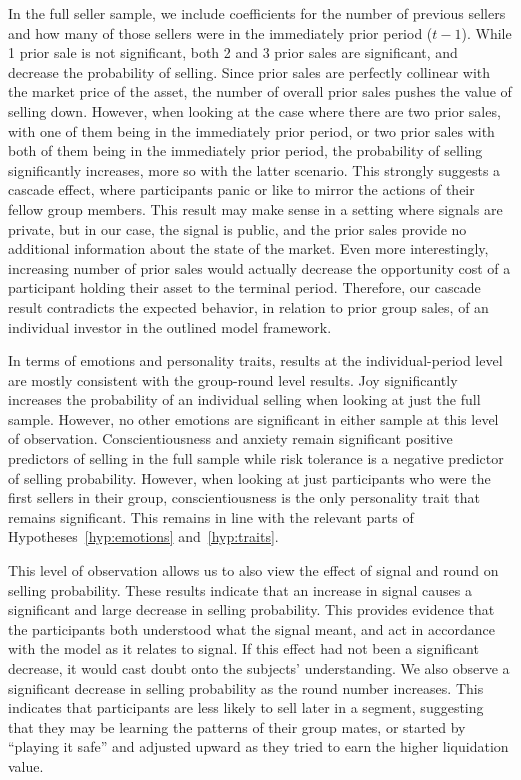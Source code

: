 \documentclass[thesis]{uathesis}
\begin{document}
\begin{body}
In the full seller sample, we include coefficients for the number of previous sellers and how many of those sellers were in the immediately prior period ($t-1$). While 1 prior sale is not significant, both 2 and 3 prior sales are significant, and decrease the probability of selling. Since prior sales are perfectly collinear with the market price of the asset, the number of overall prior sales pushes the value of selling down. However, when looking at the case where there are two prior sales, with one of them being in the immediately prior period, or two prior sales with both of them being in the immediately prior period, the probability of selling significantly increases, more so with the latter scenario. This strongly suggests a cascade effect, where participants panic or like to mirror the actions of their fellow group members. This result may make sense in a setting where signals are private, but in our case, the signal is public, and the prior sales provide no additional information about the state of the market. Even more interestingly, increasing number of prior sales would actually decrease the opportunity cost of a participant holding their asset to the terminal period. Therefore, our cascade result contradicts the expected behavior, in relation to prior group sales, of an individual investor in the outlined model framework.

In terms of emotions and personality traits, results at the individual-period level are mostly consistent with the group-round level results. Joy significantly increases the probability of an individual selling when looking at just the full sample. However, no other emotions are significant in either sample at this level of observation. Conscientiousness and anxiety remain significant positive predictors of selling in the full sample while risk tolerance is a negative predictor of selling probability. However, when looking at just participants who were the first sellers in their group, conscientiousness is the only personality trait that remains significant. This remains in line with the relevant parts of Hypotheses~\ref{hyp:emotions} and~\ref{hyp:traits}.

This level of observation allows us to also view the effect of signal and round on selling probability. These results indicate that an increase in signal causes a significant and large decrease in selling probability. This provides evidence that the participants both understood what the signal meant, and act in accordance with the model as it relates to signal. If this effect had not been a significant decrease, it would cast doubt onto the subjects' understanding. We also observe a significant decrease in selling probability as the round number increases. This indicates that participants are less likely to sell later in a segment, suggesting that they may be learning the patterns of their group mates, or started by ``playing it safe'' and adjusted upward as they tried to earn the higher liquidation value.


\end{body}
\end{document}
